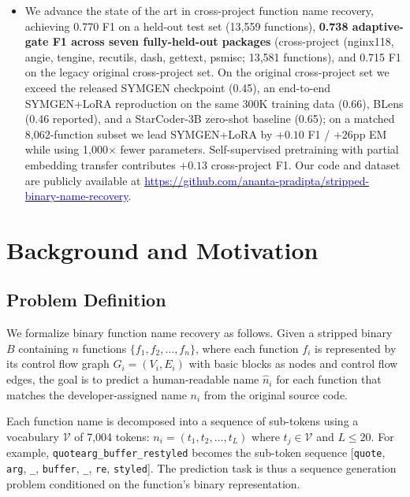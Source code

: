 \documentclass[sigconf,nonacm]{acmart}
\begin{document}
\begin{itemize}
    \item We advance the state of the art in cross-project function name recovery, achieving 0.770 F1 on a held-out test set (13{,}559 functions), \textbf{0.738 adaptive-gate F1 across seven fully-held-out packages} (cross-project (nginx118, angie, tengine, recutils, dash, gettext, psmisc; 13{,}581 functions), and 0.715 F1 on the legacy original cross-project set. On the original cross-project set we exceed the released SYMGEN checkpoint (0.45), an end-to-end SYMGEN+LoRA reproduction on the same 300K training data (0.66), BLens (0.46 reported), and a StarCoder-3B zero-shot baseline (0.65); on a matched 8{,}062-function subset we lead SYMGEN+LoRA by $+0.10$ F1 / $+26$pp EM while using 1{,}000$\times$ fewer parameters. Self-supervised pretraining with partial embedding transfer contributes $+0.13$ cross-project F1. Our code and dataset are publicly available at \href{https://github.com/ananta-pradipta/stripped-binary-name-recovery}{\textcolor{blue}{https://github.com/\allowbreak{}ananta-pradipta/\allowbreak{}stripped-binary-name-recovery}}.
\end{itemize}

\section{Background and Motivation}
\label{sec:background}

\subsection{Problem Definition}
\label{sec:problem}

We formalize binary function name recovery as follows. Given a stripped binary $B$ containing $n$ functions $\{f_1, f_2, \ldots, f_n\}$, where each function $f_i$ is represented by its control flow graph $G_i = (V_i, E_i)$ with basic blocks as nodes and control flow edges, the goal is to predict a human-readable name $\hat{n}_i$ for each function that matches the developer-assigned name $n_i$ from the original source code.

Each function name is decomposed into a sequence of sub-tokens using a vocabulary $\mathcal{V}$ of 7{,}004 tokens: $n_i = (t_1, t_2, \ldots, t_L)$ where $t_j \in \mathcal{V}$ and $L \leq 20$. For example, \texttt{quotearg\_buffer\_restyled} becomes the sub-token sequence [\texttt{quote}, \texttt{arg}, \texttt{\_}, \texttt{buffer}, \texttt{\_}, \texttt{re}, \texttt{styled}]. The prediction task is thus a sequence generation problem conditioned on the function's binary representation.
\end{document}
